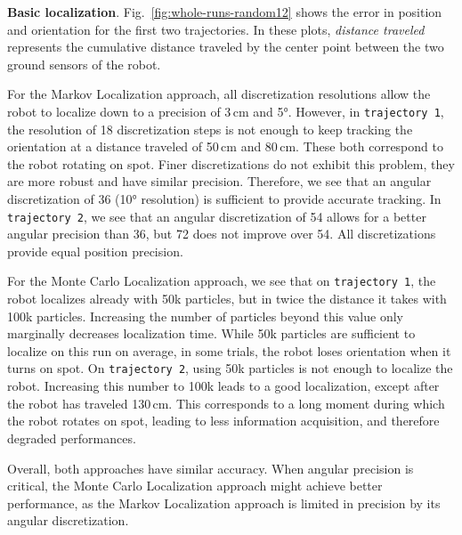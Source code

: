 \documentclass{svmult}
\newcommand{\Fig}[1]{Fig.~\ref{fig:#1}}
\begin{document}
\textbf{Basic localization}.
\Fig{whole-runs-random12} shows the error in position and orientation for the first two trajectories.
In these plots, \emph{distance traveled} represents the cumulative distance traveled by the center point between the two ground sensors of the robot.

For the Markov Localization approach, all discretization resolutions allow the robot to localize down to a precision of 3\,cm and 5°.
However, in \texttt{trajectory~1}, the resolution of 18 discretization steps is not enough to keep tracking the orientation at a distance traveled of 50\,cm and 80\,cm.
These both correspond to the robot rotating on spot.
Finer discretizations do not exhibit this problem, they are more robust and have similar precision.
Therefore, we see that an angular discretization of 36 (10° resolution) is sufficient to provide accurate tracking.
In \texttt{trajectory~2}, we see that an angular discretization of 54 allows for a better angular precision than 36, but 72 does not improve over 54.
All discretizations provide equal position precision.

For the Monte Carlo Localization approach, we see that on \texttt{trajectory~1}, the robot localizes already with 50k particles, but in twice the distance it takes with 100k particles.
Increasing the number of particles beyond this value only marginally decreases localization time.
While 50k particles are sufficient to localize on this run on average, in some trials, the robot loses orientation when it turns on spot.
On \texttt{trajectory~2}, using 50k particles is not enough to localize the robot.
Increasing this number to 100k leads to a good localization, except after the robot has traveled 130\,cm.
This corresponds to a long moment during which the robot rotates on spot, leading to less information acquisition, and therefore degraded performances.

Overall, both approaches have similar accuracy.
When angular precision is critical, the Monte Carlo Localization approach might achieve better performance, as the Markov Localization approach is limited in precision by its angular discretization.

\end{document}
